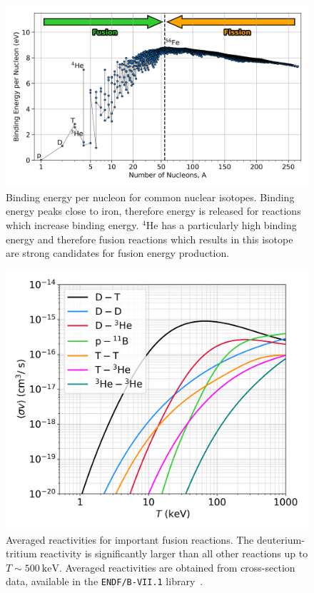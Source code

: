 \begin{figure}[t!]
    \includegraphics[width=0.9\linewidth]{Introduction/Images/BE_per_nucleon.png}
    \centering
    \caption{Binding energy per nucleon for common nuclear isotopes.
    Binding energy peaks close to iron, therefore energy is released for reactions which increase binding energy.
    ${}^{4}\text{He}$ has a particularly high binding energy and therefore fusion reactions which results in this isotope are strong candidates for fusion energy production.}%
    \label{fig:intro_BEperNucleon}
\end{figure}

\begin{figure}[t!]
    \includegraphics[width=0.6\linewidth]{Introduction/Images/fusion-reactivities.png}
    \centering
    \caption{Averaged reactivities for important fusion reactions.
    The deuterium-tritium reactivity is significantly larger than all other reactions up to $T\sim500\ \text{keV}$.
    Averaged reactivities are obtained from cross-section data, available in the \texttt{ENDF/B-VII.1} library~\cite{chadwick_endfb-vii1_2011}.
    }%
    \label{fig:intro_reactivities}
\end{figure}

